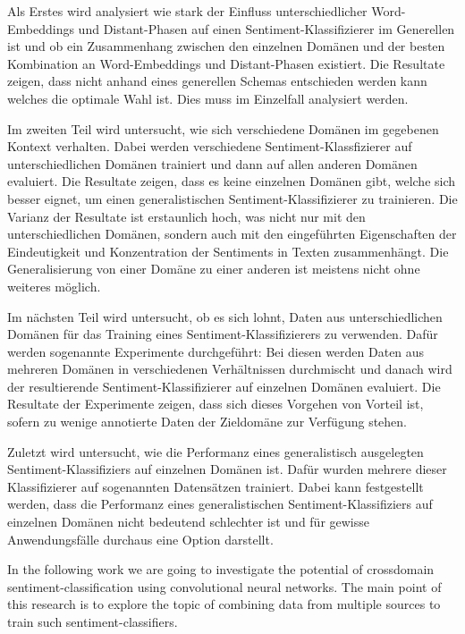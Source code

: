 Als Erstes wird analysiert wie stark der Einfluss unterschiedlicher Word-Embeddings und Distant-Phasen auf einen Sentiment-Klassifizierer im Generellen ist und ob ein Zusammenhang zwischen den einzelnen Domänen und der besten Kombination an Word-Embeddings und Distant-Phasen existiert. Die Resultate zeigen, dass nicht anhand eines generellen Schemas entschieden werden kann welches die optimale Wahl ist. Dies muss im Einzelfall analysiert werden.

Im zweiten Teil wird untersucht, wie sich verschiedene Domänen im gegebenen Kontext verhalten. Dabei werden verschiedene Sentiment-Klassfizierer auf unterschiedlichen Domänen trainiert und dann auf allen anderen Domänen evaluiert. Die Resultate zeigen, dass es keine einzelnen Domänen gibt, welche sich besser eignet, um einen generalistischen Sentiment-Klassifizierer zu trainieren. Die Varianz der Resultate ist erstaunlich hoch, was nicht nur mit den unterschiedlichen Domänen, sondern auch mit den eingeführten Eigenschaften der Eindeutigkeit und Konzentration der Sentiments in Texten zusammenhängt. Die Generalisierung von einer Domäne zu einer anderen ist meistens nicht ohne weiteres möglich.

Im nächsten Teil wird untersucht, ob es sich lohnt, Daten aus unterschiedlichen Domänen für das Training eines Sentiment-Klassifizierers zu verwenden. Dafür werden sogenannte  Experimente durchgeführt: Bei diesen werden Daten aus mehreren Domänen in verschiedenen Verhältnissen durchmischt und danach wird der resultierende Sentiment-Klassifizierer auf einzelnen Domänen evaluiert. Die Resultate der Experimente zeigen, dass sich dieses Vorgehen von Vorteil ist, sofern zu wenige annotierte Daten der Zieldomäne zur Verfügung stehen.

Zuletzt wird untersucht, wie die Performanz eines generalistisch ausgelegten Sentiment-Klassifiziers auf einzelnen Domänen ist. Dafür wurden mehrere dieser Klassifizierer auf sogenannten  Datensätzen trainiert. Dabei kann festgestellt werden, dass die Performanz eines generalistischen Sentiment-Klassifiziers auf einzelnen Domänen nicht bedeutend schlechter ist und für gewisse Anwendungsfälle durchaus eine Option darstellt.



In the following work we are going to investigate the potential of crossdomain sentiment-classification using convolutional neural networks. The main point of this research is to explore the topic of combining data from multiple sources to train such sentiment-classifiers.

